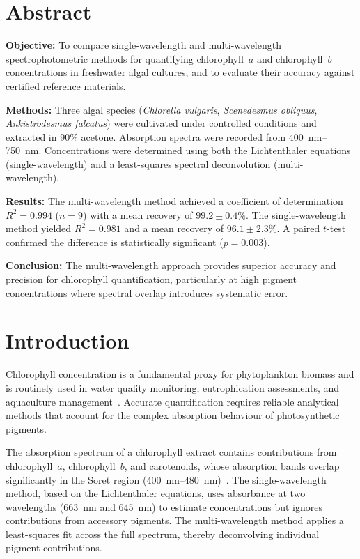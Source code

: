 \documentclass[
    language=english,
    doctype=article,
    institution=none,
    titlestyle=book,
]{../../omnilatex}
\begin{document}
\maketitle

\section*{Abstract}

\textbf{Objective:} To compare single-wavelength and multi-wavelength
spectrophotometric methods for quantifying chlorophyll~$a$ and chlorophyll~$b$
concentrations in freshwater algal cultures, and to evaluate their accuracy
against certified reference materials.

\textbf{Methods:} Three algal species (\emph{Chlorella vulgaris},
\emph{Scenedesmus obliquus}, \emph{Ankistrodesmus falcatus}) were cultivated
under controlled conditions and extracted in 90\% acetone.  Absorption spectra
were recorded from \SIrange{400}{750}{\nm}.  Concentrations were determined
using both the Lichtenthaler equations (single-wavelength) and a least-squares
spectral deconvolution (multi-wavelength).

\textbf{Results:} The multi-wavelength method achieved a coefficient of
determination $R^{2} = 0.994$ ($n = 9$) with a mean recovery of
$99.2 \pm 0.4\%$.  The single-wavelength method yielded $R^{2} = 0.981$ and a
mean recovery of $96.1 \pm 2.3\%$.  A paired $t$-test confirmed the difference
is statistically significant ($p = 0.003$).

\textbf{Conclusion:} The multi-wavelength approach provides superior accuracy
and precision for chlorophyll quantification, particularly at high pigment
concentrations where spectral overlap introduces systematic error.

\section{Introduction}

Chlorophyll concentration is a fundamental proxy for phytoplankton biomass and
is routinely used in water quality monitoring, eutrophication assessments, and
aquaculture management~\cite{bibid}.  Accurate quantification requires
reliable analytical methods that account for the complex absorption behaviour of
photosynthetic pigments.

The absorption spectrum of a chlorophyll extract contains contributions from
chlorophyll~$a$, chlorophyll~$b$, and carotenoids, whose absorption bands
overlap significantly in the Soret region
(\SIrange{400}{480}{\nm})~\cite{goossensLaTeXCompanion1993}.  The
single-wavelength method, based on the Lichtenthaler equations, uses absorbance
at two wavelengths (\SI{663}{\nm} and \SI{645}{\nm}) to estimate concentrations
but ignores contributions from accessory pigments.  The multi-wavelength method
applies a least-squares fit across the full spectrum, thereby deconvolving
individual pigment contributions.
\end{document}
